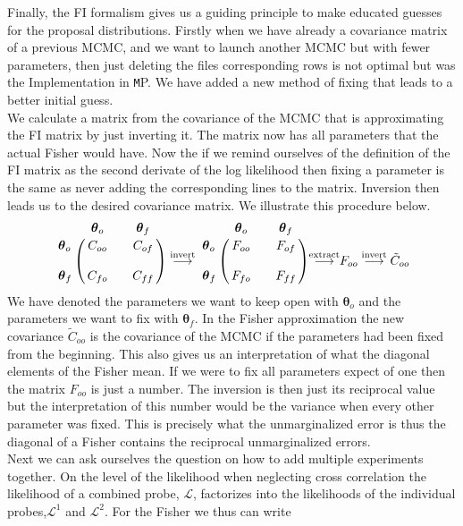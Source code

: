 \documentclass[oneside]{book}
\newcommand*{\montepython}{\texttt MP\xspace}
\begin{document}
Finally, the FI formalism gives us a guiding principle to make educated guesses for the proposal distributions. Firstly when we have already a covariance matrix of a previous MCMC, and we want to launch another MCMC but with fewer parameters, then just deleting the files corresponding rows is not optimal but was the Implementation in \montepython. We have added a new method of fixing that leads to a better initial guess.\\
We calculate a matrix from the covariance of the MCMC that is approximating the FI matrix by just inverting it. The matrix now has all parameters that the actual Fisher would have. Now the if we remind ourselves of the definition of the FI matrix as the second derivate of the log likelihood then fixing a parameter is the same as never adding the corresponding lines to the matrix. Inversion then leads us to the desired covariance matrix. We illustrate this procedure below.
\begin{equation}
    \bordermatrix{~ & \boldsymbol{\theta}_o && \boldsymbol{\theta}_f \cr
    \boldsymbol{\theta}_o &C_{oo}&& C_{of}\cr
    \cr
    \boldsymbol{\theta}_f &C_{fo}&& C_{ff}\cr } \overset{\mathrm{invert}}{\longrightarrow}     
    \bordermatrix{~ & \boldsymbol{\theta}_o && \boldsymbol{\theta}_f \cr
    \boldsymbol{\theta}_o &F_{oo}&& F_{of}\cr
    \cr
    \boldsymbol{\theta}_f &F_{fo}&& F_{ff}\cr } {\overset{\mathrm{extract}}{\longrightarrow}} F_{oo} \overset{\mathrm{invert}}{\longrightarrow} \tilde{C}_{oo} \nonumber
\end{equation}
We have denoted the parameters we want to keep open with $\boldsymbol{\theta}_o$ and the parameters we want to fix with $\boldsymbol{\theta}_f$. In the Fisher approximation the new covariance $\tilde{C}_{oo}$ is the covariance of the MCMC if the parameters had been fixed from the beginning. This also gives us an interpretation of what the diagonal elements of the Fisher mean. If we were to fix all parameters expect of one then the matrix $F_{oo}$ is just a number. The inversion is then just its reciprocal value but the interpretation of this number would be the variance when every other parameter was fixed. This is precisely what the unmarginalized error is thus the diagonal of a Fisher contains the reciprocal unmarginalized errors.\\
Next we can ask ourselves the question on how to add multiple experiments together. On the level of the likelihood when neglecting cross correlation the likelihood of a combined probe, $\mathcal{L}$, factorizes into the likelihoods of the individual probes,$\mathcal{L}^1$ and $\mathcal{L}^2$. For the Fisher we thus can write 
\end{document}
